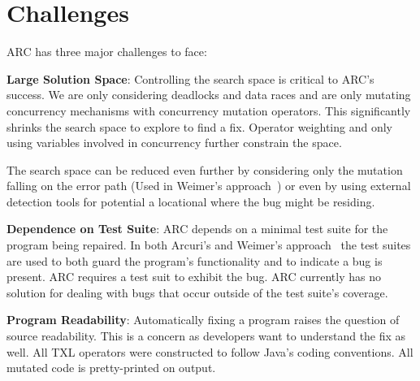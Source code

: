 \documentclass{llncs}
\begin{document}
\section{Challenges}
\label{sec:challenges}

ARC has three major challenges to face:

\textbf{Large Solution Space}: Controlling the search space is critical to ARC's
success.  We are only considering
deadlocks and data races and are only mutating concurrency mechanisms with concurrency
mutation operators. This significantly shrinks the search space to explore
to find a fix. Operator weighting and only using variables involved in concurrency
further constrain the space.

The search space can be reduced even further by considering only the mutation
falling on the error path (Used in Weimer's approach~\cite{GNFW11}) or even by
using external detection tools for potential a locational where the bug might
be residing.

\textbf{Dependence on Test Suite}: ARC depends on a minimal test suite for the
program being repaired. In both Arcuri's and Weimer's
approach~\cite{AY08,GNFW11} the test suites are used to both guard the
program's functionality and to indicate a bug is present. ARC requires a test
suit to exhibit the bug. ARC currently has no solution for dealing with bugs
that occur outside of the test suite's coverage.


\textbf{Program Readability}: Automatically fixing a program
raises the question of source readability. This is a concern as developers want to
understand the fix as well. All TXL operators were constructed to follow Java's
coding conventions.  All mutated code is pretty-printed on output.
\end{document}
